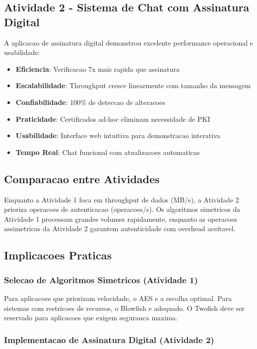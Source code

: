 \documentclass[12pt,a4paper,oneside]{article}
\begin{document}
\subsection{Atividade 2 - Sistema de Chat com Assinatura Digital}

A aplicacao de assinatura digital demonstrou excelente performance operacional e usabilidade:

\begin{itemize}
    \item \textbf{Eficiencia}: Verificacao 7x mais rapida que assinatura
    \item \textbf{Escalabilidade}: Throughput cresce linearmente com tamanho da mensagem
    \item \textbf{Confiabilidade}: 100\% de deteccao de alteracoes
    \item \textbf{Praticidade}: Certificados ad-hoc eliminam necessidade de PKI
    \item \textbf{Usabilidade}: Interface web intuitiva para demonstracao interativa
    \item \textbf{Tempo Real}: Chat funcional com atualizacoes automaticas
\end{itemize}

\subsection{Comparacao entre Atividades}

Enquanto a Atividade 1 foca em throughput de dados (MB/s), a Atividade 2 prioriza operacoes de autenticacao (operacoes/s). Os algoritmos simetricos da Atividade 1 processam grandes volumes rapidamente, enquanto as operacoes assimetricas da Atividade 2 garantem autenticidade com overhead aceitavel.

\subsection{Implicacoes Praticas}

\subsubsection{Selecao de Algoritmos Simetricos (Atividade 1)}

Para aplicacoes que priorizam velocidade, o AES e a escolha optimal. Para sistemas com restricoes de recursos, o Blowfish e adequado. O Twofish deve ser reservado para aplicacoes que exigem seguranca maxima.

\subsubsection{Implementacao de Assinatura Digital (Atividade 2)}
\end{document}
